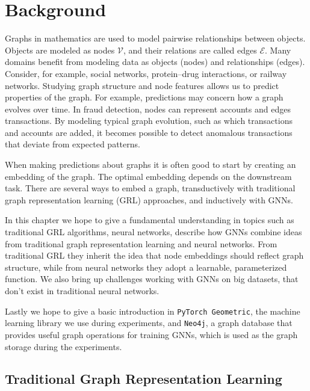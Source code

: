 \chapter{Background}\label{ch:background}


Graphs in mathematics are used to model pairwise relationships between objects. Objects are modeled as nodes $\mathcal{V}$, and their relations are called edges $\mathcal{E}$. 
Many domains benefit from modeling data as objects (nodes) and relationships (edges). Consider, for example, social networks, protein--drug interactions, or railway networks. 
Studying graph structure and node features allows us to predict properties of the graph. For example, predictions may concern how a graph evolves over time. In fraud detection, nodes can represent accounts and edges transactions. By modeling typical graph evolution, such as which transactions and accounts are added, it becomes possible to detect anomalous transactions that deviate from expected patterns.

When making predictions about graphs it is often good to start by creating an embedding of the graph. The optimal embedding depends on the downstream task. There are several ways to embed a graph, transductively with traditional graph representation learning (GRL) approaches, and inductively with GNNs.

In this chapter we hope to give a fundamental understanding in topics such as traditional GRL algorithms, neural networks, describe how GNNs combine ideas from traditional graph representation learning and neural networks. From traditional GRL they inherit the idea that node embeddings should reflect graph structure, while from neural networks they adopt a learnable, parameterized function. We also bring up challenges working with GNNs on big datasets, that don't exist in traditional neural networks.

Lastly we hope to give a basic introduction in \texttt{PyTorch Geometric}, the machine learning library we use during experiments, and \texttt{Neo4j}, a graph database that provides useful graph operations for training GNNs, which is used as the graph storage during the experiments.

\section{Traditional Graph Representation Learning}\label{sec:traditional_grl}

